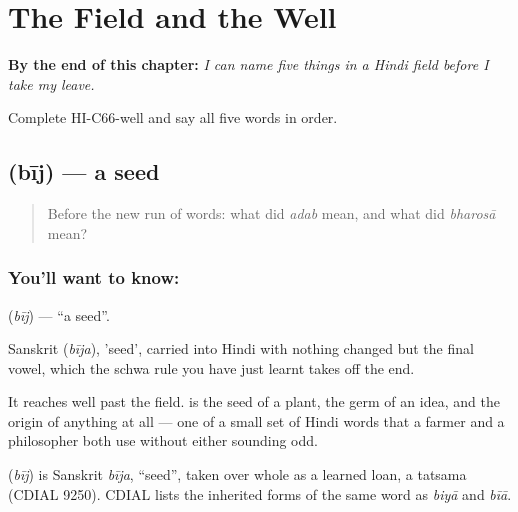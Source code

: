 
\chapter{The Field and the Well}
\label{ch:hi-the-field-and-the-well}

\begin{chapteropening}
\textbf{By the end of this chapter:} \emph{I can name five things in a Hindi field before I take my leave.}

Complete HI-C66-well and say all five words in order.
\end{chapteropening}

\section[\texorpdfstring{\hi{बीज} (bīj)}{बीज (bīj)}]{ (bīj) — a seed}

\label{lesson:HI-C66-seed}



\begin{quote}
Before the new run of words: what did \emph{adab} mean, and what did \emph{bharosā} mean?
\end{quote}

\subsection*{You'll want to know: }
\textbf{} (\emph{bīj}) — \textquotedblleft{}a seed\textquotedblright{}.

Sanskrit  (\emph{bīja}), 'seed', carried into Hindi with nothing changed but the final vowel, which the schwa rule you have just learnt takes off the end.

It reaches well past the field.  is the seed of a plant, the germ of an idea, and the origin of anything at all — one of a small set of Hindi words that a farmer and a philosopher both use without either sounding odd.

\begin{cousinweb}
\textbf{} (\emph{bīj}) is Sanskrit \emph{bīja}, \textquotedblleft{}seed\textquotedblright{}, taken over whole as a learned loan, a tatsama (CDIAL 9250). CDIAL lists the inherited forms of the same word as \emph{biyā} and \emph{bīā}.
\end{cousinweb}

